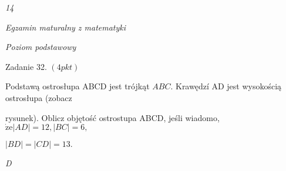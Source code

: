 \documentclass[a4paper,12pt]{article}
\begin{document}
{\it 14}

{\it Egzamin maturalny z matematyki}

{\it Poziom podstawowy}

Zadanie 32. $(4pkt)$

Podstawą ostrosłupa ABCD jest trójkąt $ABC$. Krawędzí AD jest wysokością ostrosłupa (zobacz

rysunek). Oblicz objętość ostrostupa ABCD, jeśli wiadomo, $\dot{\mathrm{z}}\mathrm{e} |AD|=12, |BC|=6,$

$|BD|=|CD|=13.$

{\it D}
\end{document}

